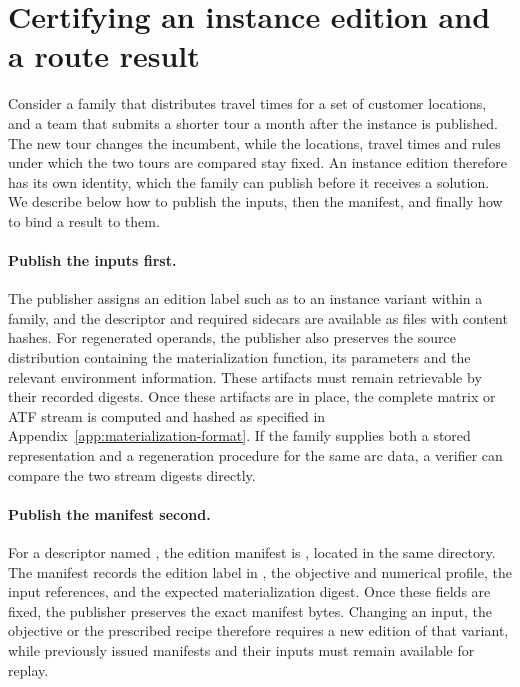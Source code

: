 \section{Certifying an instance edition and a route result}\label{app:certification-order}

Consider a family that distributes travel times for a set of customer locations, and a team that submits a shorter tour a month after the instance is published. The new tour changes the incumbent, while the locations, travel times and rules under which the two tours are compared stay fixed. An instance edition therefore has its own identity, which the family can publish before it receives a solution. We describe below how to publish the inputs, then the manifest, and finally how to bind a result to them.

\paragraph{Publish the inputs first.}
The publisher assigns an edition label such as  to an instance variant within a family, and the descriptor and required sidecars are available as files with content hashes. For regenerated operands, the publisher also preserves the source distribution containing the materialization function, its parameters and the relevant environment information. These artifacts must remain retrievable by their recorded digests. Once these artifacts are in place, the complete matrix or ATF stream is computed and hashed as specified in Appendix~\ref{app:materialization-format}. If the family supplies both a stored representation and a regeneration procedure for the same arc data, a verifier can compare the two stream digests directly.

\paragraph{Publish the manifest second.}
For a descriptor named , the edition manifest is , located in the same directory. The manifest records the edition label in , the objective and numerical profile, the input references, and the expected materialization digest. Once these fields are fixed, the publisher preserves the exact manifest bytes. Changing an input, the objective or the prescribed recipe therefore requires a new edition of that variant, while previously issued manifests and their inputs must remain available for replay.

